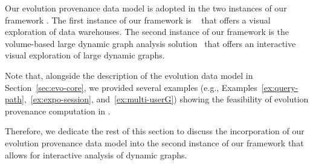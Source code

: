 \label{sec:evo-instances}
Our evolution provenance data model is adopted in the two instances of our framework {\color{Fuchsia}\framework{}}. 
The first instance of our framework is \prototype{}~\cite{BHBK18:Demo} that offers a visual exploration of data warehouses.
The second instance of our framework is the volume-based large dynamic graph analysis solution~\cite{Bruder2019} that offers an interactive visual exploration of large dynamic graphs.


Note that, alongside the description of the evolution data model in Section~\ref{sec:evo-core}, we provided several examples (e.g., Examples~\ref{ex:query-path},~\ref{ex:expo-session}, and~\ref{ex:multi-userG}) showing the feasibility of evolution provenance computation in \prototype{}.


Therefore, we dedicate the rest of this section to discuss the incorporation of our evolution provenance data model into the second instance of our framework that allows for interactive analysis of dynamic graphs. 



